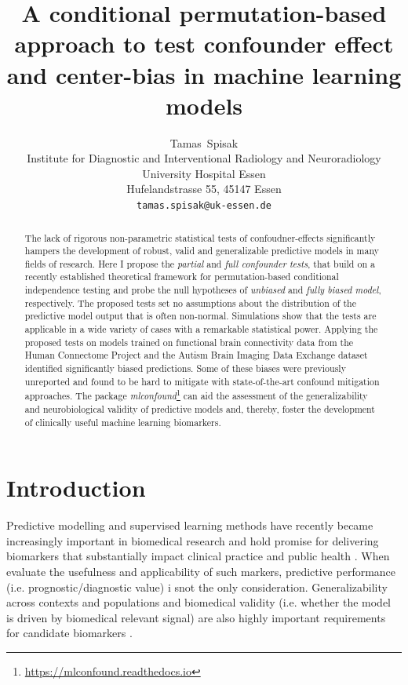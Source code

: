 \documentclass{article}
\title{A conditional permutation-based approach to test confounder effect and center-bias in machine learning models}
\author{
  Tamas~Spisak \\
  Institute for Diagnostic and Interventional Radiology and Neuroradiology \\
  University Hospital Essen\\
  Hufelandstrasse 55, 45147 Essen \\
  \texttt{tamas.spisak@uk-essen.de} \\
}
\begin{document}
\maketitle

\begin{abstract} %
The lack of rigorous non-parametric statistical tests of confoudner-effects significantly hampers the development of robust, valid and generalizable predictive models in many fields of research.
Here I propose the \emph{partial} and \emph{full confounder tests}, that build on a recently established theoretical framework for permutation-based conditional independence testing and probe the null hypotheses of \emph{unbiased} and \emph{fully biased model}, respectively.
The proposed tests set no assumptions about the distribution of the predictive model output that is often non-normal.
Simulations show that the tests are applicable in a wide variety of cases with a remarkable statistical power.
Applying the proposed tests on models trained on functional brain connectivity data from the Human Connectome Project and the Autism Brain Imaging Data Exchange dataset identified significantly biased predictions. Some of these biases were previously unreported and found to be hard to mitigate with state-of-the-art confound mitigation approaches.
The package \emph{mlconfound}\footnote{\href{https://mlconfound.readthedocs.io}{https://mlconfound.readthedocs.io}} can aid the assessment of the generalizability and neurobiological validity of predictive models and, thereby, foster the development of clinically useful machine learning biomarkers.
\end{abstract}



\section{Introduction}

Predictive modelling and supervised learning methods have recently became increasingly important in biomedical research and hold promise for delivering biomarkers that substantially impact clinical practice and public health \citep{kent2018personalized}. When evaluate the usefulness and applicability of such markers, predictive performance (i.e. prognostic/diagnostic value) i snot the only consideration. Generalizability across contexts and populations and biomedical validity (i.e. whether the model is driven by biomedical relevant signal) are also highly important requirements for candidate biomarkers \citep{woo2017building}.
\end{document}
